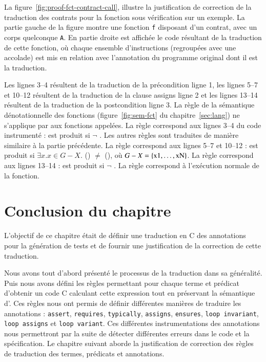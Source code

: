 La figure~\ref{fig:proof-fct-contract-call}, illustre la justification de
correction
de la traduction des contrats pour la fonction sous vérification sur un exemple.
La partie gauche de la figure montre une fonction \lstinline'f' disposant d'un
contrat, avec un corps quelconque \lstinline'A'.
En partie droite est affichée le code résultant de la traduction de cette
fonction, où chaque ensemble d'instructions (regroupées avec une accolade) est
mis en relation avec l'annotation du programme original dont il est la
traduction.

Les lignes 3--4 résultent de la traduction de la précondition ligne 1,
les lignes 5--7 et 10--12 résultent de la traduction de la clause assigns ligne
2 et les lignes 13--14 résultent de la traduction de la postcondition ligne 3.
La règle  de la sémantique dénotationnelle des fonctions
(figure~\ref{fig:sem-fct} du chapitre~\ref{sec:lang}) ne s'applique par aux
fonctions appelées.
La règle  correspond aux lignes 3--4 du code instrumenté :
\errorenv est produit si $\lnot$ .
Les autres règles sont traduites de manière similaire à la partie précédente.
La règle  correspond aux lignes 5--7 et 10--12 : \errorenv est
produit si $\exists x. x \in G-X.$
() $\ne$ (),
où $G-X = \{\mbox{\lstinline'x1'},\ldots,\mbox{\lstinline'xN'}\}$.
La règle  correspond aux lignes 13--14 : \errorenv est produit
si $\lnot$ .
La règle  correspond à l'exécution normale de la fonction.






\section*{Conclusion du chapitre}

L'objectif de ce chapitre était de définir une traduction en C des annotations
\eacsl pour la génération de tests et de fournir une justification de la
correction de cette traduction.

Nous avons tout d'abord présenté le processus de la traduction dans sa
généralité.
Puis nous avons défini les règles permettant pour chaque terme et prédicat
\eacsl d'obtenir un code C calculant cette expression tout en préservant la
sémantique d'\eacsl.
Ces règles nous ont permis de définir différentes manières de traduire les
annotations \eacsl : \lstinline'assert', \lstinline'requires',
\lstinline'typically', \lstinline'assigns', \lstinline'ensures',
\lstinline'loop invariant', \lstinline'loop assigns' et
\lstinline'loop variant'.
Ces différentes instrumentations des annotations nous permettront par la suite
de détecter différentes erreurs dans le code et la spécification.
Le chapitre suivant aborde la justification de correction des règles de
traduction des termes, prédicats et annotations.

